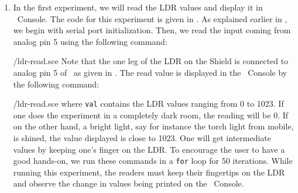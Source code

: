 \begin{enumerate}
  \item In the first experiment, we will read the LDR values and display it in
        \scilab\ Console. The code for this experiment is 
        given in  . As explained earlier in , 
        we begin with serial port initialization. Then, we read the input coming from
        analog pin 5 using the following command:  
        
        {\LocLDRscicode/ldr-read.sce}
        Note that the one leg of the LDR on
        the Shield is connected to analog pin 5 of \arduino\, 
        as given in . The read value is displayed in the 
        \scilab\ Console by the following command: 
        
        {\LocLDRscicode/ldr-read.sce} where {\tt val} contains
        the LDR values ranging from 0 to 1023. If one does the experiment in a completely dark room, the
        reading will be 0. If on the other hand, a bright light, say for instance the torch
        light from mobile, is shined, the value displayed is close to 1023. One will get
        intermediate values by keeping one’s finger on the LDR. To
        encourage the user to have a good hands-on, we run these commands in
        a {\tt for} loop for 50 iterations. While running this experiment, the readers must keep their fingertips on the LDR and
        observe the change in values being printed on the \scilab\ Console. 
        
        
        

\end{enumerate}
